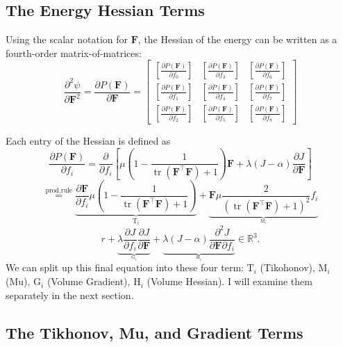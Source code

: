 \subsection{The Energy Hessian Terms}
Using the scalar notation for $\mathbf{F}$, the Hessian of the energy can be written as a fourth-order matrix-of-matrices:
\[
\frac{\partial^2 \psi}{\partial \mathbf{F}^2} = \frac{\partial P(\mathbf{F})}{\partial \mathbf{F}} = 
\left[\begin{array}{ccc}{\left[\frac{\partial P(\mathbf{F})}{\partial f_0}\right]} & {\left[\frac{\partial P(\mathbf{F})}{\partial f_3}\right]} & {\left[\frac{\partial P(\mathbf{F})}{\partial f_6}\right]} \\ {\left[\frac{\partial P(\mathbf{F})}{\partial f_1}\right]} & {\left[\frac{\partial P(\mathbf{F})}{\partial f_4}\right]} & {\left[\frac{\partial P(\mathbf{F})}{\partial f_7}\right]} \\ {\left[\frac{\partial P(\mathbf{F})}{\partial f_2}\right]} & {\left[\frac{\partial P(\mathbf{F})}{\partial f_5}\right]} & {\left[\frac{\partial P(\mathbf{F})}{\partial f_8}\right]} \end{array}\right]
\]

Each entry of the Hessian is defined as
\[
\frac{\partial P(\mathbf{F})}{\partial f_i} = \frac{\partial}{\partial f_i} \left[ \mu \left( 1 - \frac{1}{\operatorname{tr}(\mathbf{F}^\intercal \mathbf{F}) + 1}\right) \mathbf{F} + \lambda(J-\alpha)\frac{\partial J}{\partial \mathbf{F}} \right]
\]
\[
\stackrel{\text{prod.rule}}{=} \underbrace{\frac{\partial \mathbf{F}}{\partial f_i} \mu \left( 1 - \frac{1}{\operatorname{tr}(\mathbf{F}^\intercal \mathbf{F}) + 1}\right)}_{\mathrm{T}_{i}}  + \underbrace{\mathbf{F} \mu \frac{2}{\left(\operatorname{tr}(\mathbf{F^\intercal}\mathbf{F}) + 1\right)^2} f_i}_{_{\mathrm{M}_{i}}}
\]
\[
r+ \underbrace{\lambda \frac{\partial J}{\partial f_i} \frac{\partial J}{\partial \mathbf{F}}}_{_{\mathrm{G}_{i}}}+ \underbrace{\lambda (J- \alpha) \frac{\partial^2 J}{\partial \mathbf{F}\partial f_i}}_{_{\mathrm{H}_{i}}} \in \mathbb{R}^{3}.
\]
We can split up this final equation into these four term: $\mathrm{T}_i$ (Tikohonov), $\mathrm{M}_i$ (Mu), $\mathrm{G}_i$ (Volume Gradient), $\mathrm{H}_i$ (Volume Hessian). I will examine them separately in the next section.

\subsection{The Tikhonov, Mu, and Gradient Terms}
